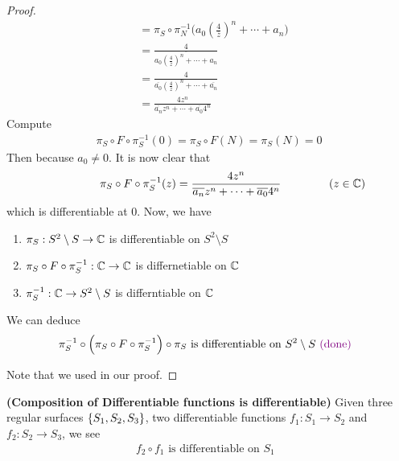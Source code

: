 \documentclass{report}
\begin{document}
\begin{proof}
\begin{align*}
&=\pi_S \circ \pi_N^{-1}\Big(a_0(\frac{4}{\overline{z}})^n+ \cdots + a_n \Big)\\
&=\frac{4}{\overline{a_0(\frac{4}{\overline{z}})^n+\cdots +a_n}}\\
&=\frac{4}{\overline{a_0}(\frac{4}{z})^n+\cdots +\overline{a_n}}\\
&=\frac{4z^n}{\overline{a_n}z^n+\cdots +\overline{a_0}4^n}
\end{align*}
Compute
\begin{align*}
\pi_S \circ F\circ \pi_S^{-1}(0)=\pi_S \circ F(N)=\pi_S(N)=0
\end{align*}
Then because $a_0\neq 0$. It is now clear that 
\begin{align*}
\hspace{1.5cm}\pi_S\circ F\circ \pi_S^{-1}(z)=\frac{4z^n}{\overline{a_n}z^n+\cdots +\overline{a_0}4^n}\hspace{1.5cm}(z\in\mathbb{C})
\end{align*}
which is differentiable at $0$. Now, we have
\begin{enumerate}[label=(\alph*)]
  \item $\pi_S:S^2\setminus S\rightarrow \mathbb{C}$ is differentiable on $S^2 \setminus S$
  \item $\pi_S\circ F\circ \pi_S^{-1}:\mathbb{C}\rightarrow \mathbb{C}$ is differnetiable on $\mathbb{C}$
   \item $\pi_S^{-1}:\mathbb{C}\rightarrow S^2\setminus S$ is differntiable on $\mathbb{C}$
\end{enumerate}
We can deduce 
\begin{align*}
\pi_S^{-1}\circ \Big(\pi_S\circ F\circ \pi_S^{-1} \Big)\circ \pi_S\text{ is differentiable on $S^2\setminus S\textcolor{violet}{\text{ (done) }}$ }
\end{align*}

Note that we used   in our proof. 
\end{proof}
\begin{theorem}
\label{CoDf}
\textbf{(Composition of Differentiable functions is differentiable)} Given three regular surfaces $\{ S_1,S_2,S_3 \}$, two differentiable functions $f_1:S_1\rightarrow S_2$ and $f_2:S_2\rightarrow S_3$, we see 
\begin{align*}
f_2\circ f_1\text{ is differentiable on $S_1$ }
\end{align*}
\end{theorem}
\end{document}
